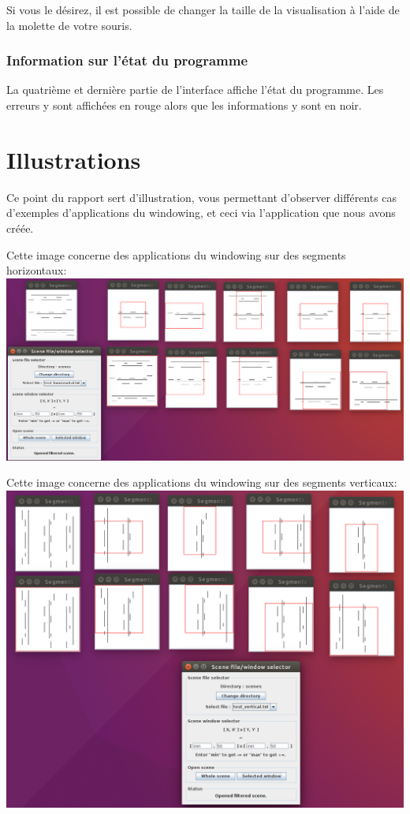 \documentclass[10pt,a4paper]{article}
\begin{document}
Si vous le désirez, il est possible de changer la taille de la visualisation à l'aide de la molette de votre souris.

\subsubsection{Information sur l'état du programme}
La quatrième et dernière partie de l'interface affiche l'état du programme. Les erreurs y sont affichées en rouge alors que les informations y sont en noir.

\section{Illustrations}
Ce point du rapport sert d'illustration, vous permettant d'observer différents cas d'exemples d'applications du windowing, et ceci via l'application que nous avons créée.


Cette image concerne des applications du windowing sur des segments horizontaux:
\includegraphics[scale=0.25]{images/test_horizontal.png}

Cette image concerne des applications du windowing sur des segments verticaux:
\includegraphics[scale=0.25]{images/test_vertical.png}
\end{document}
